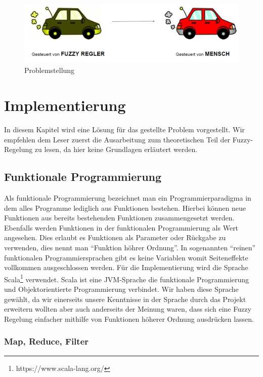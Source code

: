 \documentclass[12pt,a4paper,bibliography=totocnumbered,listof=totocnumbered, abstracton]{scrartcl}
\theoremstyle{Umgebung}
\begin{document}
\begin{figure}
	\centering
	\includegraphics[width=0.9\linewidth]{img/practical/problem}
	\caption{Problemstellung}
	\label{fig:problem}
\end{figure}

\section{Implementierung}

In diesem Kapitel wird eine Lösung für das gestellte Problem vorgestellt. Wir empfehlen dem Leser zuerst die Ausarbeitung zum theoretischen Teil der Fuzzy-Regelung zu lesen, da hier keine Grundlagen erläutert werden.

\subsection{Funktionale Programmierung}

Als funktionale Programmierung bezeichnet man ein Programmierparadigma in dem alles Programme lediglich aus Funktionen bestehen. Hierbei können neue Funktionen aus bereits bestehenden Funktionen zusammengesetzt werden. Ebenfalls werden Funktionen in der funktionalen Programmierung als Wert angesehen. Dies erlaubt es Funktionen als Parameter oder Rückgabe zu verwenden, dies nennt man \enquote{Funktion höhrer Ordnung}. In sogenannten \enquote{reinen} funktionalen Programmiersprachen gibt es keine Variablen womit Seiteneffekte vollkommen ausgeschlossen werden. Für die Implementierung wird die Sprache Scala\footnote{https://www.scala-lang.org/} verwendet. Scala ist eine JVM-Sprache die funktionale Programmierung und Objektorientierte Programmierung verbindet. Wir haben diese Sprache gewählt, da wir einerseits unsere Kenntnisse in der Sprache durch das Projekt erweitern wollten aber auch anderseits der Meinung waren, dass sich eine Fuzzy Regelung einfacher mithilfe von Funktionen höherer Ordnung ausdrücken lassen.

\subsubsection{Map, Reduce, Filter}
\end{document}
